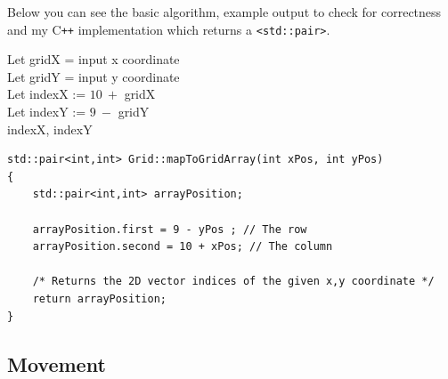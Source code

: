 \documentclass[a4paper,12pt]{article}
\begin{document}
Below you can see the basic algorithm, example output to check for correctness and my C\texttt{++} implementation which returns a \texttt{<std::pair>}.

\begin{mdframed}
    \begin{minipage}[t]{.5\textwidth}
            \vspace{0.2cm}
        \small
        \begin{algorithm}[H]
            \DontPrintSemicolon
            \SetAlgoLined
                \hspace{0.6cm}Let gridX = input x coordinate\\
                \hspace{0.5cm} Let gridY = input y coordinate\\
                \vspace{0.3cm}
                \hspace{0.5cm} Let indexX := $10\:+$ gridX\\
                \hspace{0.5cm} Let indexY := $9\:-$ gridY\\
                \vspace{0.3cm}
                \hspace{0.6cm}\Return indexX, indexY\;
        \end{algorithm}
        \normalsize
    \end{minipage}
    \begin{minipage}[t]{.5\textwidth}
            \small
            \vspace{0.2cm}
            
            \normalsize
    \end{minipage}
\end{mdframed}

\begin{lstlisting}
std::pair<int,int> Grid::mapToGridArray(int xPos, int yPos)
{
    std::pair<int,int> arrayPosition;

    arrayPosition.first = 9 - yPos ; // The row
    arrayPosition.second = 10 + xPos; // The column

    /* Returns the 2D vector indices of the given x,y coordinate */
    return arrayPosition; 
}
\end{lstlisting}
\subsection{Movement}
\end{document}
